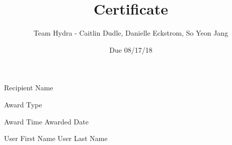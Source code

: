 \documentclass{article}
\title{Certificate}
\author{Team Hydra - Caitlin Dudle, Danielle Eckstrom, So Yeon Jang }
\date{Due 08/17/18}
\begin{document}

\begin{center}
\vspace*{.3in}
\calligra \fontsize{75}{90}\selectfont Recipient Name \normalfont \normalsize \linebreak

\vspace{2.7in}

\calligra \fontsize{40}{48}\selectfont Award Type \normalfont \normalsize \linebreak

\sffamily \fontsize{11}{13.2}\selectfont Award Time Awarded Date\normalfont \normalsize \linebreak


\vspace{.95in}
\fontsize{11}{13.2} User First Name User Last Name

\end{center}
\end{document}
